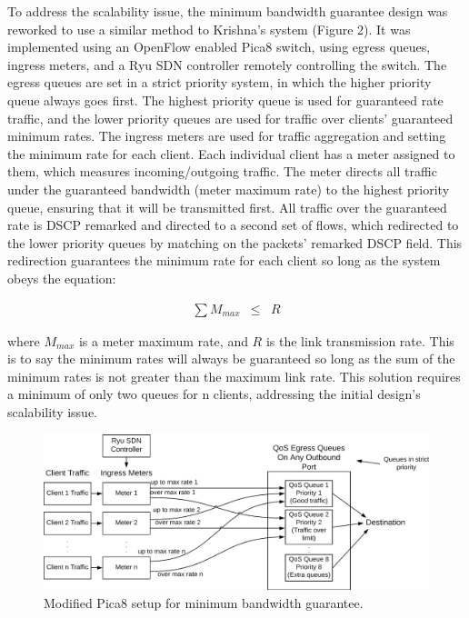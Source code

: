 \documentclass[accepted,single]{gipaper}
\begin{document}
To address the scalability issue, the minimum bandwidth guarantee design was reworked to use a similar method to Krishna’s \cite{Krishna:2016} system (Figure 2). It was implemented using an OpenFlow enabled Pica8 switch, using egress queues, ingress meters, and a Ryu SDN controller remotely controlling the switch. The egress queues are set in a strict priority system, in which the higher priority queue always goes first. The highest priority queue is used for guaranteed rate traffic, and the lower priority queues are used for traffic over clients’ guaranteed minimum rates. The ingress meters are used for traffic aggregation and setting the minimum rate for each client. Each individual client has a meter assigned to them, which measures incoming/outgoing traffic. The meter directs all traffic under the guaranteed bandwidth (meter maximum rate) to the highest priority queue, ensuring that it will be transmitted first. All traffic over the guaranteed rate is DSCP remarked and directed to a second set of flows, which redirected to the lower priority queues by matching on the packets' remarked DSCP field. This redirection guarantees the minimum rate for each client so long as the system obeys the equation:

\begin{eqnarray*}
	\sum M_{max} &\leq& R
\end{eqnarray*}

where $M_{max}$ is a meter maximum rate, and $R$ is the link transmission rate. This is to say the minimum rates will always be guaranteed so long as the sum of the minimum rates is not greater than the maximum link rate. This solution requires a minimum of only two queues for n clients, addressing the initial design's scalability issue.


\begin{figure}
	\centering
	\includegraphics[width=6in]{figs/bwGuar_v2.png}
	\caption{ Modified Pica8 setup for minimum bandwidth guarantee. } \label{bwDiag2}
\end{figure}
\end{document}
